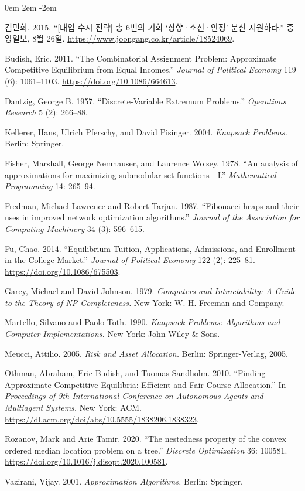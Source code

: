 \documentclass[12pt]{article} %
\newif\ifen
\theoremstyle{definition}
\theoremstyle{definition}
\begin{document}
\parskip 0em
\leftskip 2em
\parindent -2em
\ifen \else
김민희. 2015. ``{[대입 수시 전략]} 총 6번의 기회 \textellipsis `상향·소신·안정' 분산 지원하라.'' 중앙일보, 8월 26일. \url{https://www.joongang.co.kr/article/18524069}.\fi

Budish, Eric. 2011. ``The Combinatorial Assignment Problem: Approximate Competitive Equilibrium from Equal Incomes.'' \emph{Journal of Political Economy} 119 (6): 1061--1103. \url{https://doi.org/10.1086/664613}. 

Dantzig, George B. 1957. ``Discrete-Variable Extremum Problems.'' \emph{Operations Research} 5 (2): 266--88.

Kellerer, Hans, Ulrich Pferschy, and David Pisinger. 2004. \emph{Knapsack Problems.} Berlin: Springer.

\ifen Kim, Minhee. 2015. ``[College application strategy] Six chances total\dots divide applications across reach, target, and safety schools'' (in Korean). Jungang Ilbo, Aug. 26. \url{https://doi.org/10.1086/664613}\fi

Fisher, Marshall, George Nemhauser, and Laurence Wolsey. 1978. ``An analysis of approximations for maximizing submodular set functions—I.'' \emph{Mathematical Programming} 14: 265--94. 

Fredman, Michael Lawrence and Robert Tarjan. 1987. ``Fibonacci heaps and their uses in improved network optimization algorithms.'' \emph{Journal of the Association for Computing Machinery} 34 (3): 596--615.

Fu, Chao. 2014. ``Equilibrium Tuition, Applications, Admissions, and Enrollment in the College Market.'' \emph{Journal of Political Economy} 122 (2): 225--81. \url{https://doi.org/10.1086/675503}. 

Garey, Michael and David Johnson. 1979. \emph{Computers and Intractability: A Guide to the Theory of NP-Completeness.} New York: W. H. Freeman and Company. 

Martello, Silvano and Paolo Toth. 1990. \emph{Knapsack Problems: Algorithms and Computer Implementations.} New York: John Wiley \& Sons. 

Meucci, Attilio. 2005. \emph{Risk and Asset Allocation.} Berlin: Springer-Verlag, 2005. 

Othman, Abraham, Eric Budish, and Tuomas Sandholm. 2010. ``Finding Approximate Competitive Equilibria: Efficient and Fair
Course Allocation.'' In \emph{Proceedings of 9th International Conference on Autonomous Agents and Multiagent Systems.} New York: ACM. \url{https://dl.acm.org/doi/abs/10.5555/1838206.1838323}.

Rozanov, Mark and Arie Tamir. 2020. ``The nestedness property of the convex ordered median location problem on a tree.'' \emph{Discrete Optimization} 36: 100581. \url{https://doi.org/10.1016/j.disopt.2020.100581}.

Vazirani, Vijay. 2001. \emph{Approximation Algorithms.} Berlin: Springer. 
\end{document}
